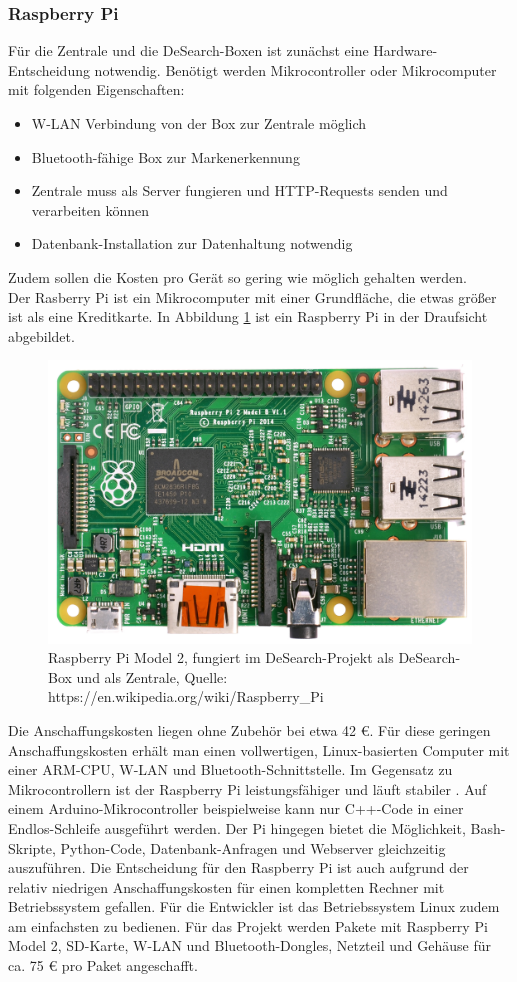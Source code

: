 \subsubsection{Raspberry Pi}\label{sssec:raspberry}
Für die Zentrale und die DeSearch-Boxen ist zunächst eine Hardware-Entscheidung notwendig. Benötigt werden Mikrocontroller oder Mikrocomputer mit folgenden Eigenschaften:
\begin{itemize}
	\item W-LAN Verbindung von der Box zur Zentrale möglich
	\item Bluetooth-fähige Box zur Markenerkennung
	\item Zentrale muss als Server fungieren und HTTP-Requests senden und verarbeiten können
	\item Datenbank-Installation zur Datenhaltung notwendig
\end{itemize}
Zudem sollen die Kosten pro Gerät so gering wie möglich gehalten werden. \\
Der Rasberry Pi ist ein Mikrocomputer mit einer Grundfläche, die etwas größer ist als eine Kreditkarte. In Abbildung \ref{fig:raspi} ist ein Raspberry Pi in der Draufsicht abgebildet.
\begin{figure}
	\centering
	\includegraphics[width=1.0\linewidth]{images/Raspberrypi}
	\caption[Raspberry Pi in der Draufsicht]{Raspberry Pi Model 2, fungiert im DeSearch-Projekt als DeSearch-Box und als Zentrale, Quelle: https://en.wikipedia.org/wiki/Raspberry\_Pi}
	\label{fig:raspi}
\end{figure}
 Die Anschaffungskosten liegen ohne Zubehör bei etwa 42 €. Für diese geringen Anschaffungskosten erhält man einen vollwertigen, Linux-basierten Computer mit einer ARM-CPU, W-LAN und Bluetooth-Schnittstelle. Im Gegensatz zu Mikrocontrollern ist der Raspberry Pi leistungsfähiger und läuft stabiler \citep[Vgl.][S.35ff.]{raspi}. Auf einem Arduino-Mikrocontroller beispielweise kann nur C++-Code in einer Endlos-Schleife ausgeführt werden. Der Pi hingegen bietet die Möglichkeit, Bash-Skripte, Python-Code, Datenbank-Anfragen und Webserver gleichzeitig auszuführen. Die Entscheidung für den Raspberry Pi ist auch aufgrund der relativ niedrigen Anschaffungskosten für einen kompletten Rechner mit Betriebssystem gefallen. Für die Entwickler ist das Betriebssystem Linux zudem am einfachsten zu bedienen. Für das Projekt werden Pakete mit Raspberry Pi Model 2, SD-Karte, W-LAN und Bluetooth-Dongles, Netzteil und Gehäuse für ca. 75 € pro Paket angeschafft.
